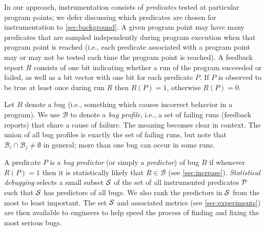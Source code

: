 \documentclass[draft]{sig-alternate}
\newcommand{\bug}{\ensuremath{B}}
\newcommand{\bugprofile}{\ensuremath{\mathcal{B}}}
\newcommand{\termdef}[1]{\emph{#1}}
\newcommand{\report}[1]{\ensuremath{R(#1)}}
\begin{document}
In our approach, instrumentation consists of \termdef{predicates} tested
at particular program points; we defer discussing which predicates are
chosen for instrumentation to \autoref{sec:background}.  A given
program point may have many predicates that are sampled independently
during program execution when that program point is reached (i.e.,
each predicate associated with a program point may or may not be
tested each time the program point is reached).  A feedback report $R$
consists of one bit indicating whether a run of the program
succeeded or failed, as well as a bit vector with one bit for each
predicate $P$.  If $P$ is observed to be true at least once during run
$R$ then $\report{P} = 1$, otherwise $\report{P} = 0$.

Let $\bug$ denote a bug (i.e., something which causes incorrect behavior in
a program).  We use $\bugprofile$ to denote a \termdef{bug profile},
i.e., a set of failing runs (feedback reports)
that share a cause of failure.  The meaning becomes clear in context.  The
union of all bug profiles is exactly the
set of failing runs, but note that $\bugprofile_i \cap \bugprofile_j \neq
\emptyset$ in general; more than one bug can occur in some runs.

A predicate $P$ is a \termdef{bug predictor} (or simply a
\termdef{predictor}) of bug $\bug$ if whenever $\report{P} = 1$
then it is statistically likely that $R \in \bugprofile$ (see
\autoref{sec:increase}).  \termdef{Statistical debugging} selects a
small subset ${\cal S}$ of the set of all instrumented predicates
${\cal P}$ such that ${\cal S}$ has predictors of all bugs.  We also
rank the predictors in ${\cal S}$ from the most to least important.
The set ${\cal S}$ and associated metrics (see
\autoref{sec:experiments}) are then available to engineers to help
speed the process of finding and fixing the most serious bugs.
\end{document}

